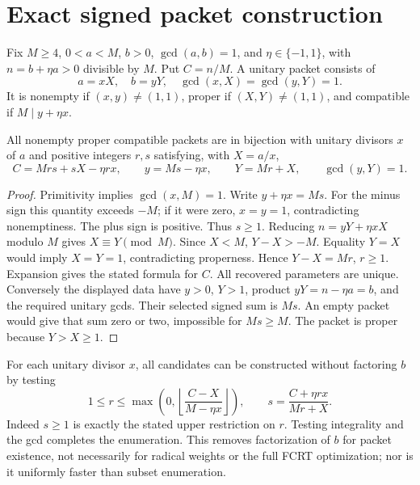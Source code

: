 \section{Exact signed packet construction}
Fix $M\ge4$, $0<a<M$, $b>0$, $\gcd(a,b)=1$, and $\eta\in\{-1,1\}$, with $n=b+\eta a>0$ divisible by $M$. Put $C=n/M$. A unitary packet consists of
\[
 a=xX,\quad b=yY,\quad \gcd(x,X)=\gcd(y,Y)=1.
\]
It is nonempty if $(x,y)\ne(1,1)$, proper if $(X,Y)\ne(1,1)$, and compatible if $M\mid y+\eta x$.
\begin{theorem}\label{normal:thm:normal}
All nonempty proper compatible packets are in bijection with unitary divisors $x$ of $a$ and positive integers $r,s$ satisfying, with $X=a/x$,
\[
 C=Mrs+sX-\eta rx,\qquad y=Ms-\eta x,\qquad Y=Mr+X,\qquad\gcd(y,Y)=1.
\]
\end{theorem}
\begin{proof}
Primitivity implies $\gcd(x,M)=1$. Write $y+\eta x=Ms$. For the minus sign this quantity exceeds $-M$; if it were zero, $x=y=1$, contradicting nonemptiness. The plus sign is positive. Thus $s\ge1$. Reducing $n=yY+\eta xX$ modulo $M$ gives $X\equiv Y\pmod M$. Since $X<M$, $Y-X>-M$. Equality $Y=X$ would imply $X=Y=1$, contradicting properness. Hence $Y-X=Mr$, $r\ge1$. Expansion gives the stated formula for $C$. All recovered parameters are unique.
Conversely the displayed data have $y>0$, $Y>1$, product $yY=n-\eta a=b$, and the required unitary gcds. Their selected signed sum is $Ms$. An empty packet would give that sum zero or two, impossible for $Ms\ge M$. The packet is proper because $Y>X\ge1$.
\end{proof}
For each unitary divisor $x$, all candidates can be constructed without factoring $b$ by testing
\[
 1\le r\le\max\left(0,\left\lfloor\frac{C-X}{M-\eta x}\right\rfloor\right),
 \qquad s=\frac{C+\eta rx}{Mr+X}.
\]
Indeed $s\ge1$ is exactly the stated upper restriction on $r$. Testing integrality and the gcd completes the enumeration. This removes factorization of $b$ for packet existence, not necessarily for radical weights or the full FCRT optimization; nor is it uniformly faster than subset enumeration.

